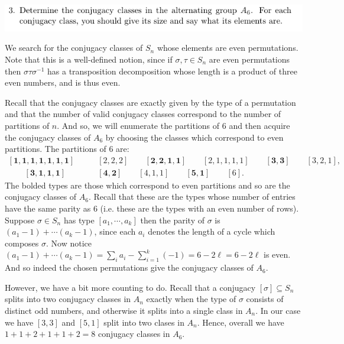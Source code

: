 \documentclass[12pt,letterpaper,boxed]{hmcpset}
\newcommand{\inv}{^{-1}}
\begin{document}
\begin{problem}
	\includegraphics[scale=0.8]{3.png}
	\hfill
\end{problem}
\begin{solution}
We search for the conjugacy classes of $S_n$ whose elements are even
permutations. Note that this is a well-defined notion, since if
$\sigma, \tau \in S_n$ are even permutations then $\sigma \tau
\sigma\inv$ has a transposition decomposition whose length is a
product of three even numbers, and is thus even.

Recall that the conjugacy classes are exactly given by the type of a
permutation and that the number of valid conjugacy classes
correspond to the number of partitions of $n$. And so, we will
enumerate the partitions of $6$ and then acquire the conjugacy classes
of $A_6$ by choosing the classes which correspond to even partitions.
The partitions of $6$ are:
\begin{align*}
	\mathbf{[1,1,1,1,1,1,1]} &\qquad [2,2,2] \qquad \mathbf{[2,2,1,1]} \qquad [2,1,1,1,1]
	\qquad \mathbf{[3,3]} \qquad [3,2,1], \\ \qquad \mathbf{[3,1,1,1]}
	&\qquad \mathbf{[4,2]} \qquad [4,1,1] \qquad \mathbf{[5,1]} \qquad [6]. 
\end{align*}
The bolded types are those which correspond to even partitions and so
are the conjugacy classes of $A_6$. Recall that these are the types
whose number of entries have the same parity as $6$ (i.e. these are
the types with an even number of rows). Suppose $\sigma \in S_n$ has
type $[a_1, \cdots, a_k]$ then the parity of $\sigma$ is 
$(a_1 - 1) + \cdots (a_k -1)$, since each $a_i$ denotes the length of
a cycle which composes $\sigma$. Now notice 
$(a_1 -1) + \cdots (a_k -1) = \sum_i a_i - \sum_{i=1}^{k} (-1) = 6 -
2\ell = 6 - 2\ell$ is even. And so indeed the chosen permutations give
the conjugacy classes of $A_6$. 

However, we have a bit more counting to do. Recall that a conjugacy
$[\sigma] \subseteq S_n$ splits into two conjugacy classes in $A_n$
exactly when the type of $\sigma$ consists of distinct odd numbers,
and otherwise it splits into a single class in $A_n$. 
In our case we have $[3,3]$ and $[5,1]$ split into two clases in
$A_n$. Hence, overall we have $1 + 1 + 2 + 1 + 1 + 2 = 8$ conjugacy
classes in $A_6$. 


\end{solution}
\end{document}
